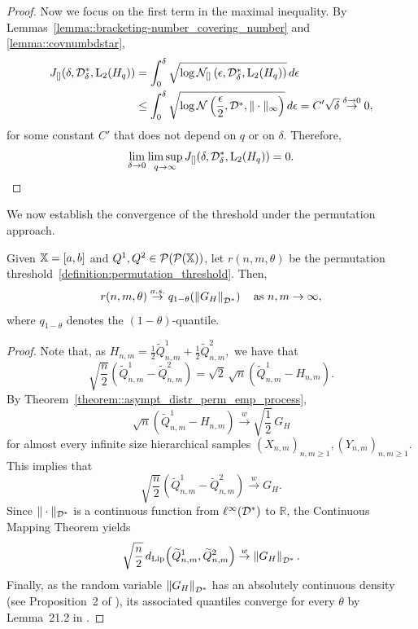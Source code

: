 \begin{proof}
Now we focus on the first term in the maximal inequality. By Lemmas~\ref{lemma::bracketing-number_covering_number} and \ref{lemma::covnumbdstar},
\begin{align*}
J_{[]} (\delta, \mathcal{D}^*_\delta, \mathrm{L}_2(H_q))
&= \int_0^\delta \sqrt{\log \mathcal{N}_{[]}\left(\epsilon, \mathcal{D}^*_\delta, \mathrm{L}_2(H_q) \right)}\,d\epsilon \\
&\leq \int_0^\delta \sqrt{\log \mathcal{N}\left(\frac{\epsilon}{2}, \mathcal{D}^*, \|\cdot\|_\infty \right)}\,d\epsilon
= C' \sqrt{\delta}
\overset{\delta \to 0}{\to} 0,
\end{align*}
for some constant $C'$ that does not depend on $q$ or on $\delta$. Therefore,
\[
\lim_{\delta \to 0} \limsup_{q \to \infty}
J_{[]} (\delta, \mathcal{D}^*_\delta, \mathrm{L}_2(H_q)) = 0.
\]
\end{proof}
We now establish the convergence of the threshold under the permutation approach.

\begin{theorem}\label{theorem::asympt_distr_perm_threshold}
Given $\mathbb{X} = [a,b]$ and $Q^1, Q^2 \in \mathcal{P}(\mathcal{P}(\mathbb{X}))$, let $r(n,m,\theta)$ be the permutation threshold~\eqref{definition:permutation_threshold}. Then,
\[
r(n,m,\theta) \overset{a.s.}{\to} q_{1-\theta}\!\left( \left\| G_{H} \right\|_{\mathcal{D}^*} \right)
\quad \text{as } n,m \to \infty,
\]
where $q_{1-\theta}$ denotes the $(1-\theta)$-quantile.
\end{theorem}
\begin{proof}
Note that, as $H_{n,m} = \frac{1}{2}\widetilde{Q}^1_{n,m} + \frac{1}{2}\widetilde{Q}^2_{n,m},$ we have that
\[
\sqrt{\frac{n}{2}}\left(\widetilde{Q}^1_{n,m} - \widetilde{Q}^2_{n,m}\right)
= \sqrt{2}\,\sqrt{n}\left(\widetilde{Q}^1_{n,m} - H_{n,m}\right).
\]
By Theorem~\ref{theorem::asympt_distr_perm_emp_process},
\[
\sqrt{n}\left(\widetilde{Q}^1_{n,m} - H_{n,m}\right)
\overset{w}{\to} \sqrt{\frac{1}{2}}\, G_H
\] 
for almost every infinite size hierarchical samples $(X_{n,m})_{n,m\geq 1}, (Y_{n,m})_{n,m\geq 1}$.
This implies that
\[
\sqrt{\frac{n}{2}}\left(\widetilde{Q}^1_{n,m} - \widetilde{Q}^2_{n,m}\right)
\overset{w}{\to} G_H.
\]
Since $\|\cdot\|_{\mathcal{D}^*}$ is a continuous function from $\ell^\infty(\mathcal{D}^*)$ to $\mathbb{R}$, the Continuous Mapping Theorem yields
\[
\sqrt{\frac{n}{2}}\,
d_{\mathrm{Lip}}\!\left(\widetilde{Q}^1_{n,m}, \widetilde{Q}^2_{n,m}\right)
\overset{w}{\to}
\left\| G_H \right\|_{\mathcal{D}^*}.
\]
Finally, as the random variable $\left\| G_H \right\|_{\mathcal{D}^*}$ has an absolutely continuous density (see Proposition~2 of \cite{beran1986confidence}), its associated quantiles converge for every $\theta$ by Lemma~21.2 in \cite{van2000asymptotic}.
\end{proof}


